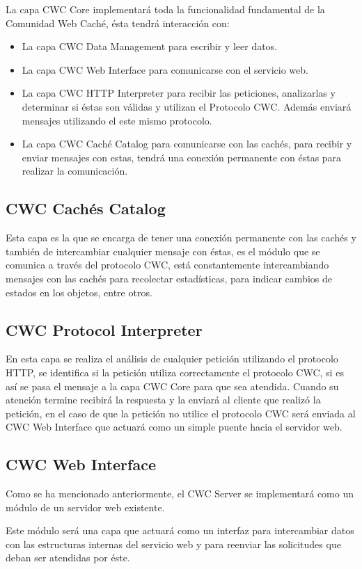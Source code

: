 La capa CWC Core implementará toda la funcionalidad fundamental de la Comunidad Web Caché, ésta tendrá interacción con:
\begin{itemize}
\item La capa CWC Data Management para escribir y leer datos.
\item La capa CWC Web Interface para comunicarse con el servicio web.
\item La capa CWC HTTP Interpreter para recibir las peticiones, analizarlas y determinar si éstas son válidas y utilizan el Protocolo CWC. Además enviará mensajes utilizando el este mismo protocolo.
\item La capa CWC Caché Catalog para comunicarse con las cachés, para recibir y enviar mensajes con estas, tendrá una conexión permanente con éstas para realizar la comunicación.
\end{itemize}

\subsection{CWC Cachés Catalog}
Esta capa es la que se encarga de tener una conexión permanente con las cachés y también de intercambiar cualquier mensaje con éstas, es el módulo que se comunica a través del protocolo CWC, está constantemente intercambiando mensajes con las cachés para recolectar estadísticas, para indicar cambios de estados en los objetos, entre otros. 

\subsection{CWC Protocol Interpreter}
En esta capa se realiza el análisis de cualquier petición utilizando el protocolo HTTP,  se identifica si la petición utiliza correctamente el protocolo CWC, si es así se pasa el mensaje a la capa CWC Core para que sea atendida. Cuando su atención termine recibirá la respuesta y la enviará al cliente que realizó la petición, en el caso de que la petición no utilice el protocolo CWC será enviada al CWC Web Interface que actuará como un simple puente hacia el servidor web.

\subsection{CWC Web Interface}
Como se ha mencionado anteriormente, el CWC Server se implementará como un módulo de un servidor web existente. 

Este módulo será una capa que actuará como un interfaz para intercambiar datos con las estructuras internas del servicio web y para reenviar las solicitudes que deban ser atendidas por éste.

